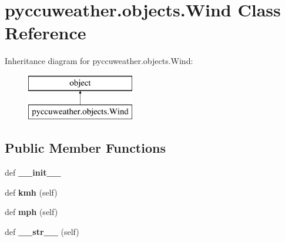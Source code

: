 \hypertarget{classpyccuweather_1_1objects_1_1_wind}{}\section{pyccuweather.\+objects.\+Wind Class Reference}
\label{classpyccuweather_1_1objects_1_1_wind}
Inheritance diagram for pyccuweather.\+objects.\+Wind\+:\begin{figure}[H]
\begin{center}
\leavevmode
\includegraphics[height=2.000000cm]{classpyccuweather_1_1objects_1_1_wind}
\end{center}
\end{figure}
\subsection*{Public Member Functions}
\begin{DoxyCompactItemize}
\item 
\hypertarget{classpyccuweather_1_1objects_1_1_wind_a2f423b5cf45f8dd60b4b3364e5f4f3ac}{}def {\bfseries \+\_\+\+\_\+init\+\_\+\+\_\+}\label{classpyccuweather_1_1objects_1_1_wind_a2f423b5cf45f8dd60b4b3364e5f4f3ac}

\item 
\hypertarget{classpyccuweather_1_1objects_1_1_wind_ada5377451eb00b24eb0afce693e3a98f}{}def {\bfseries kmh} (self)\label{classpyccuweather_1_1objects_1_1_wind_ada5377451eb00b24eb0afce693e3a98f}

\item 
\hypertarget{classpyccuweather_1_1objects_1_1_wind_a6413e92428abdc1ebbed1e63ba16dae5}{}def {\bfseries mph} (self)\label{classpyccuweather_1_1objects_1_1_wind_a6413e92428abdc1ebbed1e63ba16dae5}

\item 
\hypertarget{classpyccuweather_1_1objects_1_1_wind_ae0582ccd76b8277739cea932778d14d0}{}def {\bfseries \+\_\+\+\_\+str\+\_\+\+\_\+} (self)\label{classpyccuweather_1_1objects_1_1_wind_ae0582ccd76b8277739cea932778d14d0}

\end{DoxyCompactItemize}
